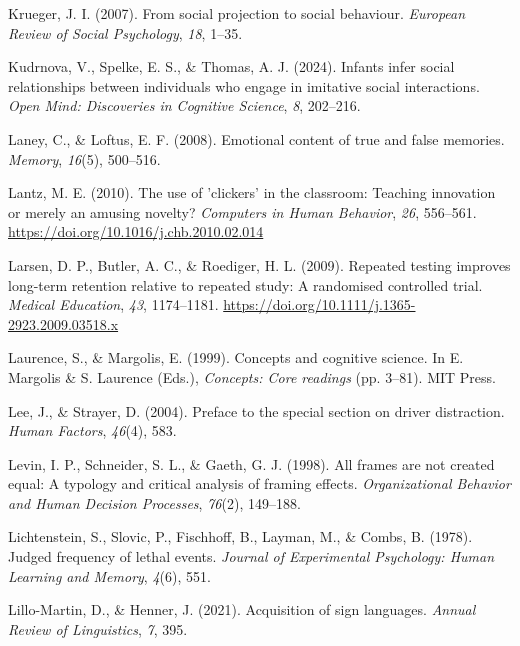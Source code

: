 \documentclass[
]{krantz}
\newlength{\cslhangindent}
\newenvironment{CSLReferences}[2] %
 {\begin{list}{}{%
  \setlength{\itemindent}{0pt}
  \setlength{\leftmargin}{0pt}
  \setlength{\parsep}{0pt}
  \ifodd #1
   \setlength{\leftmargin}{\cslhangindent}
   \setlength{\itemindent}{-1\cslhangindent}
  \fi
  \setlength{\itemsep}{#2\baselineskip}}}
 {\end{list}}
\begin{document}
\begin{CSLReferences}{1}{0}
Krueger, J. I. (2007). From social projection to social behaviour. \emph{European Review of Social Psychology}, \emph{18}, 1--35.

Kudrnova, V., Spelke, E. S., \& Thomas, A. J. (2024). Infants infer social relationships between individuals who engage in imitative social interactions. \emph{Open Mind: Discoveries in Cognitive Science}, \emph{8}, 202--216.

Laney, C., \& Loftus, E. F. (2008). Emotional content of true and false memories. \emph{Memory}, \emph{16}(5), 500--516.

Lantz, M. E. (2010). The use of 'clickers' in the classroom: Teaching innovation or merely an amusing novelty? \emph{Computers in Human Behavior}, \emph{26}, 556--561. \url{https://doi.org/10.1016/j.chb.2010.02.014}

Larsen, D. P., Butler, A. C., \& Roediger, H. L. (2009). Repeated testing improves long-term retention relative to repeated study: A randomised controlled trial. \emph{Medical Education}, \emph{43}, 1174--1181. \url{https://doi.org/10.1111/j.1365-2923.2009.03518.x}

Laurence, S., \& Margolis, E. (1999). Concepts and cognitive science. In E. Margolis \& S. Laurence (Eds.), \emph{Concepts: Core readings} (pp. 3--81). MIT Press.

Lee, J., \& Strayer, D. (2004). Preface to the special section on driver distraction. \emph{Human Factors}, \emph{46}(4), 583.

Levin, I. P., Schneider, S. L., \& Gaeth, G. J. (1998). All frames are not created equal: A typology and critical analysis of framing effects. \emph{Organizational Behavior and Human Decision Processes}, \emph{76}(2), 149--188.

Lichtenstein, S., Slovic, P., Fischhoff, B., Layman, M., \& Combs, B. (1978). Judged frequency of lethal events. \emph{Journal of Experimental Psychology: Human Learning and Memory}, \emph{4}(6), 551.

Lillo-Martin, D., \& Henner, J. (2021). Acquisition of sign languages. \emph{Annual Review of Linguistics}, \emph{7}, 395.


\end{CSLReferences}
\end{document}
